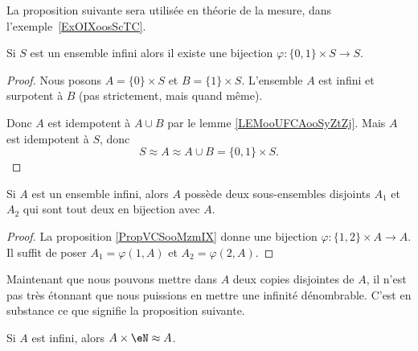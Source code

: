 La proposition suivante sera utilisée en théorie de la mesure, dans l'exemple~\ref{ExOIXoosScTC}.
\begin{proposition} \label{PropVCSooMzmIX}
    Si \( S\) est un ensemble infini alors il existe une bijection \( \varphi\colon \{ 0,1 \}\times S\to S\).
\end{proposition}

\begin{proof}
    Nous posons \( A=\{ 0 \}\times S\) et \( B=\{ 1 \}\times S\). L'ensemble \( A\) est infini et surpotent à \( B\) (pas strictement, mais quand même).

    Donc \( A\) est idempotent à \( A\cup B\) par le lemme \ref{LEMooUFCAooSyZtZj}. Mais \( A\) est idempotent à \( S\), donc
    \begin{equation}
        S\approx A \approx A\cup B=\{ 0,1 \}\times S.
    \end{equation}
\end{proof}

\begin{corollary}       \label{CORooJCSIooOeOICJ}
    Si \( A\) est un ensemble infini, alors \( A\) possède deux sous-ensembles disjoints \( A_1\) et \( A_2\) qui sont tout deux en bijection avec \( A\).
\end{corollary}

\begin{proof}
    La proposition \ref{PropVCSooMzmIX} donne une bijection \( \varphi\colon \{ 1,2 \}\times A\to A\). Il suffit de poser \( A_1=\varphi(1,A)\) et \( A_2=\varphi(2,A)\).
\end{proof}

Maintenant que nous pouvons mettre dans \( A\) deux copies disjointes de \( A\), il n'est pas très étonnant que nous puissions en mettre une infinité dénombrable. C'est en substance ce que signifie la proposition suivante.
\begin{proposition} \label{PROPooFKBEooKXqujV}
    Si \( A\) est infini, alors \( A\times \eN\approx A\).
\end{proposition}

